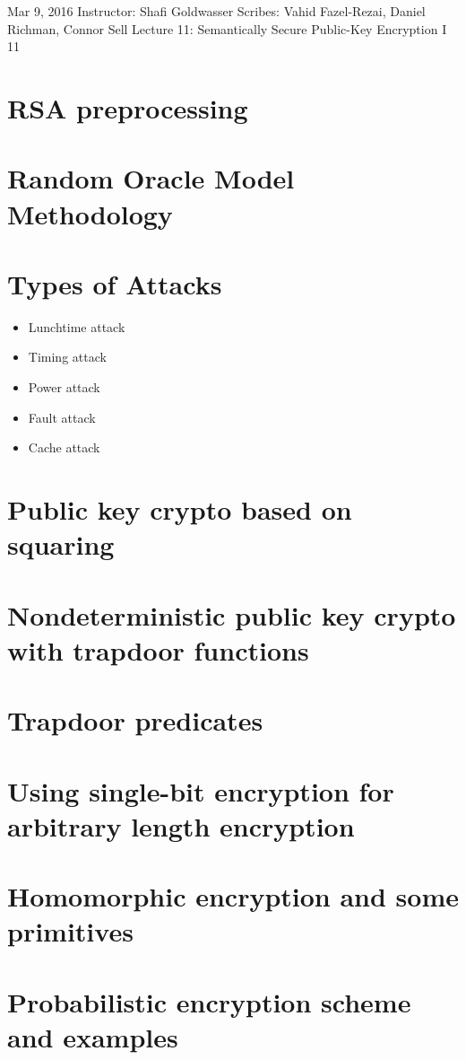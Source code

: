 \documentclass[10pt]{article}
\newcommand{\scribes}{Vahid Fazel-Rezai, Daniel Richman, Connor Sell}
\newcommand{\lecnumber}{11}
\newcommand{\lectitle}{Semantically Secure Public-Key Encryption I
}
\newcommand{\thedate}{Mar 9, 2016}
\begin{document}


{\thedate}
{Instructor: Shafi Goldwasser}
{Scribes: \scribes}
{Lecture \lecnumber: \lectitle}
{\lecnumber}


\section{RSA preprocessing}

\section{Random Oracle Model Methodology}

\section{Types of Attacks}

\begin{itemize}
	\item Lunchtime attack
	\item Timing attack
	\item Power attack
	\item Fault attack
	\item Cache attack
\end{itemize}

\section{Public key crypto based on squaring}

\section{Nondeterministic public key crypto with trapdoor functions}

\section{Trapdoor predicates}

\section{Using single-bit encryption for arbitrary length encryption}

\section{Homomorphic encryption and some primitives}

\section{Probabilistic encryption scheme and examples}





\nocite{*}


\end{document}

